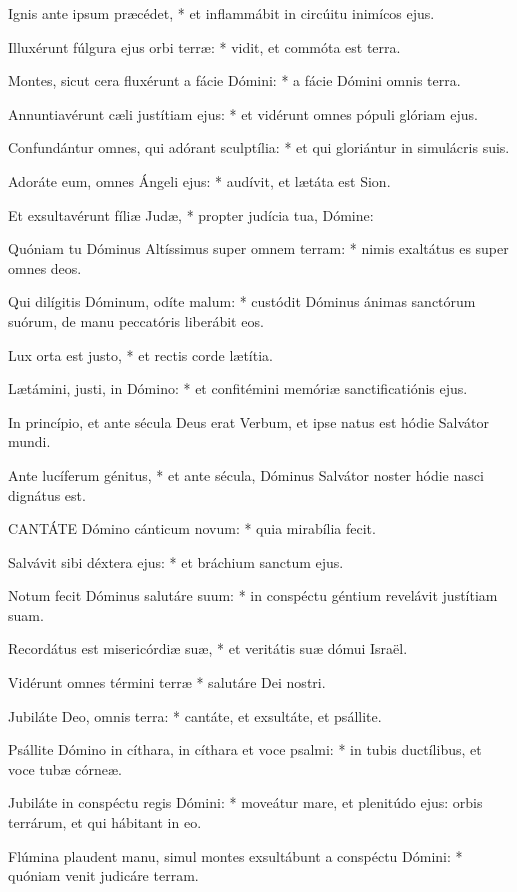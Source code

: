Ignis ante ipsum præcédet, * et inflammábit in circúitu inimícos ejus.

Illuxérunt fúlgura ejus orbi terræ: * vidit, et commóta est terra.

Montes, sicut cera fluxérunt a fácie Dómini: * a fácie Dómini omnis terra.

Annuntiavérunt cæli justítiam ejus: * et vidérunt omnes pópuli glóriam ejus.

Confundántur omnes, qui adórant sculptília: * et qui gloriántur in simulácris suis.

Adoráte eum, omnes Ángeli ejus: * audívit, et lætáta est Sion.

Et exsultavérunt fíliæ Judæ, * propter judícia tua, Dómine:

Quóniam tu Dóminus Altíssimus super omnem terram: * nimis exaltátus es super omnes deos.

Qui dilígitis Dóminum, odíte malum: * custódit Dóminus ánimas sanctórum suórum, de manu peccatóris liberábit eos.

Lux orta est justo, * et rectis corde lætítia.

Lætámini, justi, in Dómino: * et confitémini memóriæ sanctificatiónis ejus.

 In princípio, et ante sécula Deus erat Verbum, et ipse natus est hódie Salvátor mundi.

 Ante lucíferum génitus, * et ante sécula, Dóminus Salvátor noster hódie nasci dignátus est.


\lettrine[lines=2]{C}{ANTÁTE} Dómino cánticum novum: * quia mirabília fecit.

Salvávit sibi déxtera ejus: * et bráchium sanctum ejus.

Notum fecit Dóminus salutáre suum: * in conspéctu géntium revelávit justítiam suam.

Recordátus est misericórdiæ suæ, * et veritátis suæ dómui Israël.

Vidérunt omnes términi terræ * salutáre Dei nostri.

Jubiláte Deo, omnis terra: * cantáte, et exsultáte, et psállite.

Psállite Dómino in cíthara, in cíthara et voce psalmi: * in tubis ductílibus, et voce tubæ córneæ.

Jubiláte in conspéctu regis Dómini: * moveátur mare, et plenitúdo ejus: orbis terrárum, et qui hábitant in eo.

Flúmina plaudent manu, simul montes exsultábunt a conspéctu Dómini: * quóniam venit judicáre terram.

